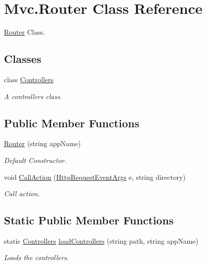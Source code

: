 \hypertarget{class_mvc_1_1_router}{}\section{Mvc.\+Router Class Reference}
\label{class_mvc_1_1_router}


\hyperlink{class_mvc_1_1_router}{Router} Class.  


\subsection*{Classes}
\begin{DoxyCompactItemize}
\item 
class \hyperlink{class_mvc_1_1_router_1_1_controllers}{Controllers}
\begin{DoxyCompactList}\small\item\em A controllers class. \end{DoxyCompactList}\end{DoxyCompactItemize}
\subsection*{Public Member Functions}
\begin{DoxyCompactItemize}
\item 
\hyperlink{class_mvc_1_1_router_a875ceb54c490e2d1d3f38d22552c1ccc}{Router} (string app\+Name)
\begin{DoxyCompactList}\small\item\em Default Constructor. \end{DoxyCompactList}\item 
void \hyperlink{class_mvc_1_1_router_a4fd8fe9a8853330f74267b4a56bcb4a4}{Call\+Action} (\hyperlink{class_p_http_1_1_http_request_event_args}{Http\+Request\+Event\+Args} e, string directory)
\begin{DoxyCompactList}\small\item\em Call action. \end{DoxyCompactList}\end{DoxyCompactItemize}
\subsection*{Static Public Member Functions}
\begin{DoxyCompactItemize}
\item 
static \hyperlink{class_mvc_1_1_router_1_1_controllers}{Controllers} \hyperlink{class_mvc_1_1_router_aab057f45a02f85a3b6ceaff85a1edf6e}{load\+Controllers} (string path, string app\+Name)
\begin{DoxyCompactList}\small\item\em Loads the controllers. \end{DoxyCompactList}\end{DoxyCompactItemize}
